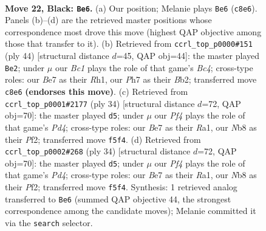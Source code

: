 \documentclass[11pt]{article}
\begin{document}
\clearpage

\begin{figure}[p]\centering
\begin{subfigure}{0.46\textwidth}\centering
\resizebox{\linewidth}{!}{%
\newchessgame
\chessboard[
  setfen={rnb1kr2/pp2b1pp/8/3pPp1P/8/P5P1/3NN3/R1B2RK1 b - - 2 22},
  showmover=false,
  pgfstyle=straightmove, color=movearrow, markmove={c8-e6}
]}
\caption{}
\end{subfigure}\hfill
\begin{subfigure}{0.46\textwidth}\centering
\resizebox{\linewidth}{!}{%
\newchessgame
\chessboard[
  setfen={2nr1k2/pp6/1b5r/3P1p1p/1PB1pP2/P7/1B4PP/1K1R3R w - - 4 23},
  showmover=false,
  pgfstyle=straightmove, color=movearrow, markmove={c4-e2}
]}
\caption{}
\end{subfigure}
\\[4pt]
\begin{subfigure}{0.46\textwidth}\centering
\resizebox{\linewidth}{!}{%
\newchessgame
\chessboard[
  setfen={2nrkb1r/pp4pp/4pp2/8/3P1B2/1PN5/1P3PPP/R2R2K1 w k - 2 18},
  showmover=false,
  pgfstyle=straightmove, color=movearrow, markmove={d4-d5}
]}
\caption{}
\end{subfigure}\hfill
\begin{subfigure}{0.46\textwidth}\centering
\resizebox{\linewidth}{!}{%
\newchessgame
\chessboard[
  setfen={2nrkb1r/pp4pp/4pp2/8/3P1B2/1PN5/1P3PPP/R2R2K1 w k - 2 18},
  showmover=false,
  pgfstyle=straightmove, color=movearrow, markmove={d4-d5}
]}
\caption{}
\end{subfigure}
\caption{\textbf{Move 22, Black: \texttt{Be6}.} (a) Our position; Melanie plays \texttt{Be6} (\texttt{c8e6}). Panels (b)--(d) are the retrieved master positions whose correspondence most drove this move (highest QAP objective among those that transfer to it). (b) Retrieved from \texttt{ccrl\_top\_p0000\#151} (ply 44) [structural distance $d$=45, QAP obj=44]: the master played \texttt{Be2}; under $\mu$ our \emph{Bc1} plays the role of that game's \emph{Bc4}; cross-type roles: our \emph{B}e7 as their \emph{R}h1, our \emph{P}h7 as their \emph{B}b2; transferred move \texttt{c8e6} \textbf{(endorses this move)}. (c) Retrieved from \texttt{ccrl\_top\_p0001\#2177} (ply 34) [structural distance $d$=72, QAP obj=70]: the master played \texttt{d5}; under $\mu$ our \emph{Pf4} plays the role of that game's \emph{Pd4}; cross-type roles: our \emph{B}e7 as their \emph{R}a1, our \emph{N}b8 as their \emph{P}f2; transferred move \texttt{f5f4}. (d) Retrieved from \texttt{ccrl\_top\_p0002\#268} (ply 34) [structural distance $d$=72, QAP obj=70]: the master played \texttt{d5}; under $\mu$ our \emph{Pf4} plays the role of that game's \emph{Pd4}; cross-type roles: our \emph{B}e7 as their \emph{R}a1, our \emph{N}b8 as their \emph{P}f2; transferred move \texttt{f5f4}. Synthesis: 1 retrieved analog transferred to \texttt{Be6} (summed QAP objective 44, the strongest correspondence among the candidate moves); Melanie committed it via the \texttt{search} selector.}
\label{fig:thought-m43}
\end{figure}
\end{document}
